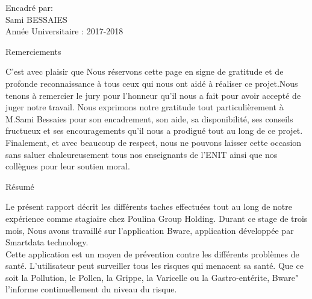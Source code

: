 \documentclass[11pt,fleqn]{book} %
\begin{document}
	Encadré par:\\
	\vspace{0.5cm}
	{\Large Sami BESSAIES\\}
	\vspace{1cm}
	Année Universitaire : 2017-2018
	\par
	
	
	\endgroup
	
	\frontmatter
	
	
	\begin{center}
		\vspace*{5cm}
		\par\normalfont\fontsize{20}{20}\sffamily\selectfont
		Remerciements
		\par\normalfont\fontsize{14}{14}\sffamily\selectfont
		\vspace*{1cm}
		C’est avec plaisir que Nous réservons cette page en signe de gratitude et de profonde reconnaissance à tous ceux qui nous ont aidé à réaliser ce projet.Nous tenons à remercier le jury pour l’honneur qu’il nous a fait pour avoir accepté de juger notre travail. Nous exprimons notre gratitude tout particulièrement à M.Sami Bessaies pour son encadrement, son aide, sa disponibilité, ses conseils fructueux et ses encouragements qu’il nous a prodigué tout au long de ce projet.	Finalement, et avec beaucoup de respect, nous ne pouvons laisser cette occasion sans saluer chaleureusement tous nos enseignants de l’ENIT ainsi que nos collègues pour leur soutien moral.\par
	\end{center}
	
	
	
	\newpage
	\begin{center}
		\vspace*{5cm}
		\normalfont
		{\LARGE Résumé}
		\vspace*{1cm}
	\end{center}
	
	Le présent rapport décrit les différents taches effectuées tout au long de notre expérience comme stagiaire chez Poulina Group Holding. Durant ce stage de trois mois, Nous avons travaillé sur l'application Bware, application développée par Smartdata technology.\\
	Cette application est un moyen de prévention contre les différents problèmes de santé. L'utilisateur peut surveiller tous les risques qui menacent sa santé. Que ce soit la Pollution, le Pollen, la Grippe, la Varicelle ou la Gastro-entérite, Bware" l'informe continuellement du niveau du risque.\\
	
\end{document}
